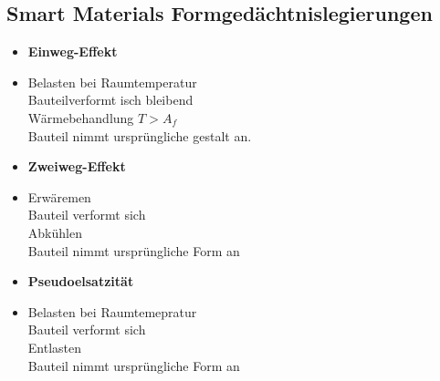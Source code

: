 \documentclass[8.5pt,twocolumn]{extarticle}
\begin{document}
    \subsection{Smart Materials Formgedächtnislegierungen}
    \begin{minipage}[t]{0.32\columnwidth}
        \begin{itemize}[label={}, leftmargin=*, itemsep=0.01em]
            \item \textbf{Einweg-Effekt}
            \item Belasten bei Raumtemperatur \\ Bauteilverformt isch bleibend \\ Wärmebehandlung $T > A_f$ \\Bauteil nimmt ursprüngliche gestalt an.
        \end{itemize}
    \end{minipage}\hfill
    \begin{minipage}[t]{0.32\columnwidth}
        \begin{itemize}[label={}, leftmargin=*,  itemsep=0.01em]
            \item \textbf{Zweiweg-Effekt} 
            \item Erwäremen \\ Bauteil verformt sich \\ Abkühlen \\ Bauteil nimmt ursprüngliche Form an
        \end{itemize} 
    \end{minipage}\hfill
    \begin{minipage}[t]{0.32\columnwidth}
        \begin{itemize}[label={}, leftmargin=*,  itemsep=0.01em]
            \item \textbf{Pseudoelsatzität} 
            \item Belasten bei Raumtemepratur \\ Bauteil verformt sich \\ Entlasten \\ Bauteil nimmt ursprüngliche Form an
        \end{itemize} 
    \end{minipage}\hfill
\end{document}
